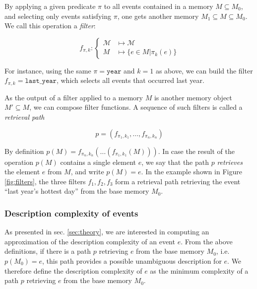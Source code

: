 \documentclass[entropy,article,submit,moreauthors,pdftex]{Definitions/mdpi}
\begin{document}
By applying a given predicate $\pi$ to all events contained in a memory $M \subseteq M_0$, and selecting only events satisfying $\pi$, one gets another memory $M_1 \subseteq M \subseteq M_0$. We call this operation a \emph{filter}:

\begin{equation}
    \label{eq:filter}
    f_{\pi, k}: \begin{cases}
        \mathcal{M} & \mapsto \mathcal{M}           \\
        M           & \mapsto \{e \in M | \pi_k(e) \}
    \end{cases}
\end{equation}

For instance, using the same $\pi = \mathtt{year}$ and $k=1$ as above, we can
build the filter $f_{\pi, k} = \mathtt{last\_{}year}$, which selects all events
that occurred last year.

As the output of a filter applied to a memory $M$ is another memory
object $M' \subseteq M$, we can compose filter
functions. A sequence of such filters is called a \emph{retrieval path}

\begin{equation}
    \label{eq:ret_def}
    p = (f_{\pi_{1}, k_{1}}, \dots, f_{\pi_{n}, k_{n}})
\end{equation}

By definition
$p(M) = f_{\pi_{n}, k_{n}}(\dots(f_{\pi_{1}, k_{1}}(M)))$.
In case the result of the operation $p(M)$ contains a single element
$e$, we say that the path $p$ \emph{retrieves} the element $e$ from $M$, and write
$p(M) = e$. In the example shown in Figure \ref{fig:filters}, the three filters $f_1, f_2, f_3$ form a retrieval path retrieving the event ``last year's hottest day'' from the base memory $M_0$.

\subsubsection{Description complexity of events}

As presented in sec. \ref{sec:theory}, we are interested in computing an approximation of the description complexity of an event $e$. From the above definitions, if there is a path $p$ retrieving $e$ from the base memory $M_0$, i.e. $p(M_0) = e$, this path provides a possible unambiguous description for $e$. We therefore define the description complexity of $e$ as the minimum complexity of a path $p$ retrieving $e$ from the base memory $M_0$.
\end{document}
